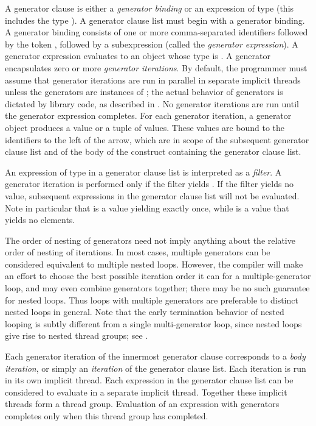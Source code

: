A generator clause is either a \emph{generator binding} or
an expression of type 
(this includes the type ).
A generator clause list must begin with a generator binding.
A generator binding consists of one or more
comma-separated identifiers followed by the token \EXP{\leftarrow},
followed by a subexpression (called the \emph{generator expression}).
A generator expression evaluates to an object whose type is
.  A generator encapsulates zero or more
\emph{generator iterations}.  By default, the programmer must assume
that generator iterations are run in parallel in separate implicit
threads unless the generators are instances of ; the
actual behavior of generators is dictated by library code, as
described in .
No generator iterations are run until the generator expression completes.
For each generator iteration, a generator object produces a value or a tuple
of values.  These values are bound to the identifiers to the left of the arrow,
which are in scope of the subsequent generator clause list and of the
body of the construct containing the generator clause list.

An expression of type  in a
generator clause list is interpreted as a \emph{filter}.  A generator
iteration is performed only if the filter yields \EXP{()}.
If the filter yields no value, subsequent expressions in
the generator clause list will not be evaluated.  Note in particular that  is a  value yielding \EXP{()} exactly once, while  is a  value that yields no elements.

The order of nesting of generators need not imply anything about the
relative order of nesting of iterations.  In most cases, multiple
generators can be considered equivalent to multiple nested loops.
However, the compiler will make an effort to choose the best possible
iteration order it can for a multiple-generator loop, and may even
combine generators together; there may be no such guarantee for nested
loops.  Thus loops with multiple generators are preferable to distinct nested loops in general.
Note that the early termination behavior of nested looping is subtly
different from a single multi-generator loop, since nested loops give
rise to nested thread groups; see .

Each generator iteration of the innermost generator clause
corresponds to a \emph{body iteration}, or simply an \emph{iteration}
of the generator clause list.  Each iteration is run in its own implicit
thread.  Each expression in the generator clause list can be considered
to evaluate in a separate implicit thread.  Together these implicit
threads form a thread group.  Evaluation of an expression with generators
completes only when this thread group has completed.


